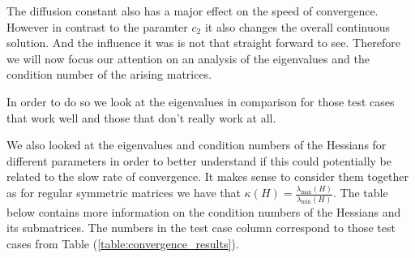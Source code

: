 \documentclass[../draft_1.tex]{subfiles}
\begin{document}
The diffusion constant also has a major effect on the speed of convergence. However in contrast to the paramter $c_2$ it also changes the overall continuous solution. And the influence it was is not that straight forward to see. Therefore we will now focus our attention on an analysis of the eigenvalues and the condition number of the arising matrices. 

In order to do so we look at the eigenvalues in comparison for those test cases that work well and those that don't really work at all.



We also looked at the eigenvalues and condition numbers of the Hessians for different parameters in order to better understand if this could potentially be related to the slow rate of convergence. It makes sense to consider them together as for regular symmetric matrices we have that $\kappa(H) = \frac{\lambda_{\text{max}}(H)}{\lambda_{\text{min}}(H)}$. The table below contains more information on the condition numbers of the Hessians and its submatrices. The numbers in the test case column correspond to those test cases from Table (\ref{table:convergence_results}). 
\end{document}
